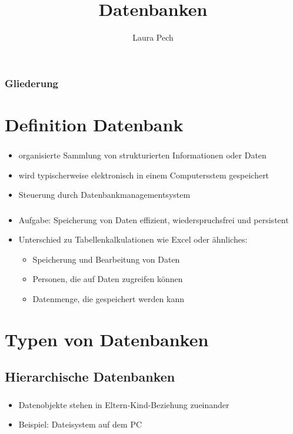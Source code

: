 \documentclass[aspectratio=169,14pt,xcolor=dvipsnames]{beamer}
\title{Datenbanken}
\author[]{Laura Pech}
\institute{Unitedprint.com SE\\Auszubildende Fachinformatikerin für Anwendungsentwicklung}
\date{\datum}
\begin{document}
\maketitle

\begin{frame}[t]
    \frametitle{Gliederung}
    \hypersetup{linkcolor=black}
    \tableofcontents%
\end{frame}

\section{Definition Datenbank}

\begin{frame}[t]
    \frametitle{\secname}
    \begin{itemize}
        \item organisierte Sammlung von strukturierten Informationen oder Daten
        \item wird typischerweise elektronisch in einem Computersstem gespeichert
        \item Steuerung durch Datenbankmanagementsystem
    \end{itemize}
\end{frame}

\begin{frame}[t]
    \frametitle{\secname}
    \begin{itemize}
        \item Aufgabe: Speicherung von Daten effizient, wiederspruchsfrei und persistent
        \item Unterschied zu Tabellenkalkulationen wie Excel oder ähnliches:
        \begin{itemize}
            \item Speicherung und Bearbeitung von Daten
            \item Personen, die auf Daten zugreifen können
            \item Datenmenge, die gespeichert werden kann
        \end{itemize}
    \end{itemize}
\end{frame}

\section{Typen von Datenbanken}

\subsection{Hierarchische Datenbanken}
\begin{frame}[t]
    \frametitle{\subsecname}
    \begin{itemize}
        \item Datenobjekte stehen in Eltern-Kind-Beziehung zueinander
        \item Beispiel: Dateisystem auf dem PC
    \end{itemize}
\end{frame}
\end{document}
